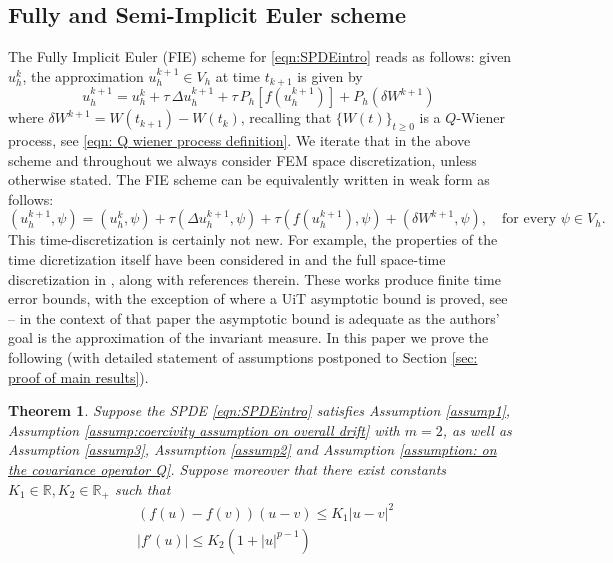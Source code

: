 \documentclass[reqno, 11pt]{amsart}
\theoremstyle{plain}
\newtheorem{theorem}{Theorem}[section]
\theoremstyle{definition}
\theoremstyle{remark}
\numberwithin{equation}{section}
\numberwithin{theorem}{section}
\newcommand{\R}{\mathbb{R}}
\begin{document}
{\subsection{Fully and Semi-Implicit Euler scheme}\label{subsec:fully implicit scheme}
The Fully Implicit Euler (FIE) scheme for \eqref{eqn:SPDEintro} reads as follows: given $u_h^k$, the approximation $u_h^{k+1}\in V_h$ at time $t_{k+1}$ is given by
$$
u_h^{k+1} = u_h^{k} + \tau \,\Delta u_h^{k+1}  +
\tau \,P_h [f(u_h^{k+1})] + P_h (\delta W^{k+1}) \, 
$$
where $\delta W^{k+1} = W(t_{k+1})- W(t_k)$, recalling that $\{W(t)\}_{t\geq 0}$ is a $Q$-Wiener process, see \eqref{eqn: Q wiener process definition}. We iterate that in the above scheme and throughout we always consider FEM space discretization, unless otherwise stated. 
The FIE scheme can be equivalently  written in weak form as follows: 
\begin{equation}\label{scheme:im}
(u_h^{k+1}, \psi) = (u_h^{k}, \psi) + \tau (\Delta u_h^{k+1}, \psi)  +
\tau(f(u_h^{k+1}), \psi) + (\delta W^{k+1}, \psi), \quad \mbox{for every } \psi\in V_h.
\end{equation}
This time-discretization is certainly not new. For example, the properties of the time dicretization itself have been considered in \cite{breit2024weak,CuiH19,KovacsLL15} and the full space-time discretization in \cite{JentzenKW11, cui2021weak, liu2021strong, QiW19,FengLZ17}, along with references therein. These works produce  finite time error bounds, with the exception of  \cite{cui2021weak} where a UiT asymptotic bound is proved, see \cite[Corollary 1]{cui2021weak} -- in the context of that paper  the asymptotic bound is adequate as  the authors' goal is the approximation of the invariant measure. In this paper we prove the following (with detailed statement of assumptions postponed to Section \ref{sec: proof of main results}). 
\begin{theorem}\label{thm:Uit for fully implicit scheme}
    Suppose the SPDE \eqref{eqn:SPDEintro} satisfies Assumption \ref{assump1},  Assumption \ref{assump:coercivity assumption on overall drift} with $m=2$, as well as Assumption \ref{assump3}, Assumption \ref{assump2} and Assumption \ref{assumption: on the covariance operator Q}.  
    Suppose moreover that there exist constants $K_1 \in \R, K_2 \in \R_+$ such that 
    \begin{align}
    & (f(u) - f(v))(u-v) \leq K_1 |u-v|^2 \label{C21} \\
    & |f'(u)| \leq K_2 (1+ |u|^{p-1}) \label{C22}
    \end{align}

\end{theorem}}
\end{document}
